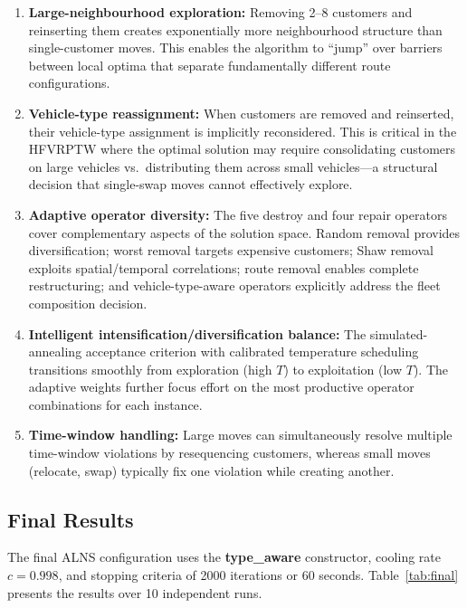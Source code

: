 \documentclass[11pt]{article}
\begin{document}
\begin{enumerate}[leftmargin=*]
    \item \textbf{Large-neighbourhood exploration:} Removing 2--8 customers and reinserting them creates exponentially more neighbourhood structure than single-customer moves. This enables the algorithm to ``jump'' over barriers between local optima that separate fundamentally different route configurations.

    \item \textbf{Vehicle-type reassignment:} When customers are removed and reinserted, their vehicle-type assignment is implicitly reconsidered. This is critical in the HFVRPTW where the optimal solution may require consolidating customers on large vehicles vs.\ distributing them across small vehicles---a structural decision that single-swap moves cannot effectively explore.

    \item \textbf{Adaptive operator diversity:} The five destroy and four repair operators cover complementary aspects of the solution space. Random removal provides diversification; worst removal targets expensive customers; Shaw removal exploits spatial/temporal correlations; route removal enables complete restructuring; and vehicle-type-aware operators explicitly address the fleet composition decision.

    \item \textbf{Intelligent intensification/diversification balance:} The simulated-annealing acceptance criterion with calibrated temperature scheduling transitions smoothly from exploration (high $T$) to exploitation (low $T$). The adaptive weights further focus effort on the most productive operator combinations for each instance.

    \item \textbf{Time-window handling:} Large moves can simultaneously resolve multiple time-window violations by resequencing customers, whereas small moves (relocate, swap) typically fix one violation while creating another.
\end{enumerate}

\subsection{Final Results}

The final ALNS configuration uses the \textbf{type\_aware} constructor, cooling rate $c = 0.998$, and stopping criteria of 2000 iterations or 60 seconds. Table~\ref{tab:final} presents the results over 10 independent runs.
\end{document}
